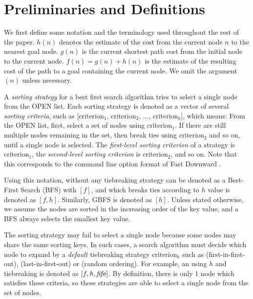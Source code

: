 \section{Preliminaries and Definitions}

\label{sec:preliminaries}

We first define some notation and the terminology used throughout the
rest of the paper.
$h(n)$ denotes the estimate of the cost from the current node $n$ to the nearest goal node.
$g(n)$ is the current shortest path cost from the initial node to the current node.
$f(n)=g(n)+h(n)$ is the estimate of the resulting cost of the path to a goal
containing the current node.
We omit the argument $(n)$ unless necessary.

A \emph{sorting strategy} for a best first search algorithm 
tries to select a single node from the OPEN list.
Each sorting strategy is denoted as a vector of several \emph{sorting criteria}, such as
[$\text{criterion}_1$, $\text{criterion}_2$, $\ldots$,
$\text{criterion}_k$], which means: From the OPEN list, first, select a
set of nodes using $\text{criterion}_1$.  If there are still multiple
nodes remaining in the set, then break ties using $\text{criterion}_2$
and so on, until a single node is selected.  The \emph{first-level
sorting criterion} of a strategy is $\text{criterion}_1$, the
\emph{second-level sorting criterion} is $\text{criterion}_2$, and so on.
Note that this corresponds to the command line option format of Fast
Downward \cite{Helmert2006}.

Using this notation, \astar without any tiebreaking strategy can be
denoted as a Best-First Search (BFS) with $[f]$, and \astar which breaks ties according to $h$
value is denoted as $[f,h]$. Similarly, GBFS is denoted as 
$[h]$.  Unless stated otherwise, we assume the nodes are sorted in the
increasing order of the key value, and a BFS always selects the smallest
key value.

The sorting strategy may fail to select a single node because some nodes
may share the same sorting keys. In such cases, a search algorithm must
decide which node to expand by a \emph{default} tiebreaking
strategy $\text{criterion}_k$ such as  \fifo (first-in-first-out), \lifo
(last-in-first-out) or \ro (random ordering).
For example, an \astar using $h$ and \fifo tiebreaking is denoted as $[f,h,{\text{\textit{fifo}}}]$.
By definition, there is only 1 node which satisfies these criteria, so these
strategies are able to select a single node from the set of
nodes.

